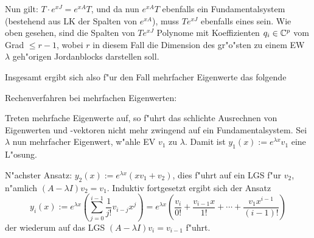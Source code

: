 {  Nun gilt: $T\cdot e^{xJ}=e^{xA}T$, und da nun $e^{xA}T$ ebenfalls
  ein Fundamentalsystem (bestehend aus LK der Spalten von $e^{xA}$),
  muss $Te^{xJ}$ ebenfalls eines sein. Wie oben gesehen, sind die
  Spalten von $Te^{xJ}$ Polynome mit Koeffizienten $q_i\in\mathbb C^p$
  vom Grad $\leq r-1$, wobei $r$ in diesem Fall die Dimension des
  gr"o"sten zu einem EW $\lambda$ geh"origen Jordanblocks darstellen soll.
  
  Insgesamt ergibt sich also f"ur den Fall mehrfacher Eigenwerte das
  folgende
  }
\remark Rechenverfahren bei mehrfachen Eigenwerten:{
  Treten mehrfache Eigenwerte auf, so f"uhrt das schlichte Ausrechnen
  von Eigenwerten und -vektoren nicht mehr zwingend auf ein Fundamentalsystem.
  Sei $\lambda$ nun mehrfacher Eigenwert, w"ahle EV $v_1$ zu $\lambda$.
  Damit ist $y_1(x):=e^{\lambda x}v_1$ eine L"osung.
  
  N"achster Ansatz: $y_2(x):=e^{\lambda x}(xv_1+v_2)$, dies f"uhrt auf
  ein LGS f"ur $v_2$, n"amlich $(A-\lambda I)v_2=v_1$. Induktiv 
  fortgesetzt ergibt sich der Ansatz
  \[y_i(x):=e^{\lambda x}\left(\sum_{j=0}^{i-1} \frac 1 {j!} v_{i-j} x^j\right)
    =e^{\lambda x}\left(\frac{v_i}{0!}+\frac{v_{i-1}x}{1!}+\cdots+\frac{v_1x^{i-1}}{(i-1)!}\right)
    \]
  der wiederum auf das LGS $(A-\lambda I)v_i=v_{i-1}$ f"uhrt.
  }
